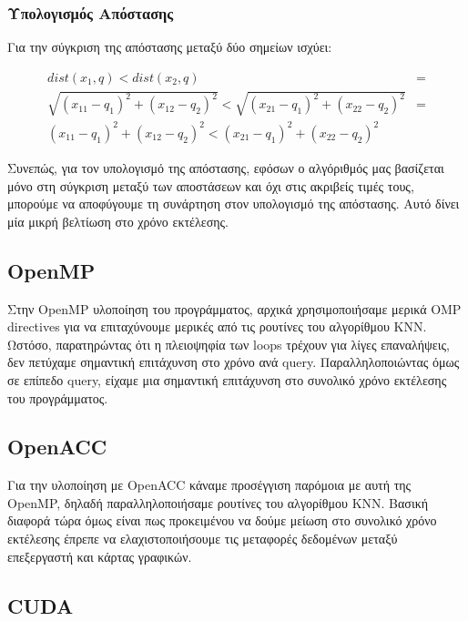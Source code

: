 \documentclass[11pt]{scrartcl} %
\begin{document}
\subsubsection{Υπολογισμός Απόστασης}

Για την σύγκριση της απόστασης μεταξύ δύο σημείων ισχύει:

\begin{equation}
    \begin{split}
        dist(x_1, q) < dist(x_2, q) &= \\
        \sqrt{(x_{11} - q_1)^2 + (x_{12} - q_2)^2} < \sqrt{(x_{21} - q_1)^2 + (x_{22} - q_2)^2} &= \\
        {(x_{11} - q_1)^2 + (x_{12} - q_2)^2} < {(x_{21} - q_1)^2 + (x_{22} - q_2)^2}
    \end{split}
\end{equation}

Συνεπώς, για τον υπολογισμό της απόστασης, εφόσων ο αλγόριθμός μας
βασίζεται μόνο στη σύγκριση μεταξύ των αποστάσεων και όχι στις ακριβείς τιμές τους, μπορούμε 
να αποφύγουμε τη συνάρτηση  στον υπολογισμό της απόστασης. 
Αυτό δίνει μία μικρή βελτίωση στο χρόνο εκτέλεσης.


\subsection{OpenMP}

Στην OpenMP υλοποίηση του προγράμματος, αρχικά χρησιμοποιήσαμε μερικά OMP directives
για να επιταχύνουμε μερικές από τις ρουτίνες του αλγορίθμου ΚΝΝ.
Ωστόσο, παρατηρώντας ότι η πλειοψηφία των loops τρέχουν για λίγες επαναλήψεις, δεν πετύχαμε σημαντική επιτάχυνση στο χρόνο ανά query.
Παραλληλοποιώντας όμως σε επίπεδο query, είχαμε μια σημαντική επιτάχυνση στο συνολικό χρόνο εκτέλεσης του προγράμματος.

\subsection{OpenACC}

Για την υλοποίηση με OpenACC κάναμε προσέγγιση παρόμοια με αυτή της OpenMP, δηλαδή
παραλληλοποιήσαμε ρουτίνες του αλγορίθμου KNN. 
Βασική διαφορά τώρα όμως είναι πως προκειμένου να δούμε μείωση στο συνολικό χρόνο εκτέλεσης έπρεπε 
να ελαχιστοποιήσουμε τις μεταφορές δεδομένων μεταξύ επεξεργαστή και κάρτας γραφικών.

\subsection{CUDA}
\end{document}
